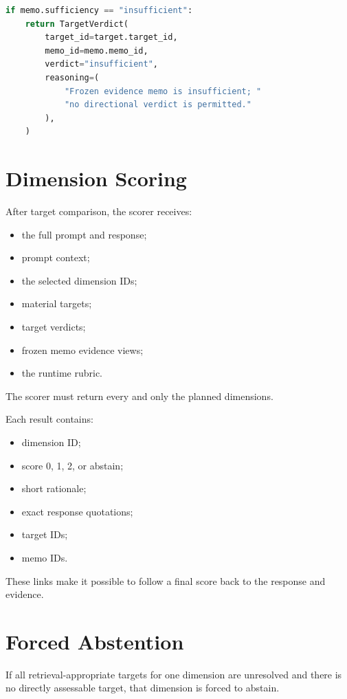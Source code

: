 \begin{lstlisting}[language=Python,caption={Insufficient-evidence rule from src/cultverify/scoring.py.}]
if memo.sufficiency == "insufficient":
    return TargetVerdict(
        target_id=target.target_id,
        memo_id=memo.memo_id,
        verdict="insufficient",
        reasoning=(
            "Frozen evidence memo is insufficient; "
            "no directional verdict is permitted."
        ),
    )
\end{lstlisting}

\section{Dimension Scoring}

After target comparison, the scorer receives:

\begin{itemize}
\item the full prompt and response;
\item prompt context;
\item the selected dimension IDs;
\item material targets;
\item target verdicts;
\item frozen memo evidence views;
\item the runtime rubric.
\end{itemize}

The scorer must return every and only the planned dimensions.

Each result contains:

\begin{itemize}
\item dimension ID;
\item score 0, 1, 2, or abstain;
\item short rationale;
\item exact response quotations;
\item target IDs;
\item memo IDs.
\end{itemize}

These links make it possible to follow a final score back to the response and evidence.

\section{Forced Abstention}

If all retrieval-appropriate targets for one dimension are unresolved and there is no directly assessable target, that dimension is forced to abstain.

